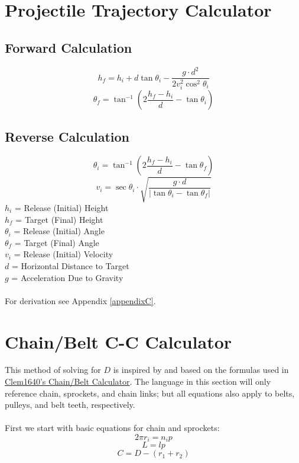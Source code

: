 \documentclass[11pt,a4paper,titlepage]{article}
\begin{document}
	\newpage
	\section{Projectile Trajectory Calculator}
	\subsection{Forward Calculation}
	\begin{equation} \label{proj_final_height}
		h_f = h_i + d \tan \theta_i - \frac{g \cdot d^2}{2 v_i^2 \cos^2 \theta_i}
	\end{equation}
	\begin{equation} \label{proj_final_angle}
		\theta_f = \tan^{-1} \left( 2 \frac{h_f - h_i}{d} - \tan \theta_i \right)
	\end{equation}
	
	\subsection{Reverse Calculation}
	\begin{equation} \label{proj_init_angle}
		\theta_i = \tan^{-1} \left( 2 \frac{h_f - h_i}{d} - \tan \theta_f \right)
	\end{equation}
	\begin{equation} \label{proj_init_vel}
		v_i = \sec \theta_i \cdot \sqrt{\frac{g \cdot d}{\left| \tan \theta_i - \tan \theta_f \right|}}
	\end{equation}
	$h_i$ = Release (Initial) Height \\
	$h_f$ = Target (Final) Height \\
	$\theta_i$ = Release (Initial) Angle \\
	$\theta_f$ = Target (Final) Angle \\
	$v_i$ = Release	(Initial) Velocity \\
	$d$ = Horizontal Distance to Target \\
	$g$ = Acceleration Due to Gravity\\ \\
	For derivation see Appendix \ref{appendixC}.
	
	\bigskip
	\section{Chain/Belt C-C Calculator}
	This method of solving for $D$ is inspired by and based on the formulas used in \href{https://www.chiefdelphi.com/t/paper-chain-belt-calculator/168971}{Clem1640's Chain/Belt Calculator}. The language in this section will only reference chain, sprockets, and chain links; but all equations also apply to belts, pulleys, and belt teeth, respectively. \\ \\		
	First we start with basic equations for chain and sprockets:
	\begin{equation}
		2 \pi r_i = n_i p
	\end{equation}
	\begin{equation}
		L = l p
	\end{equation}
	\begin{equation}
		C = D - (r_1 + r_2)
	\end{equation}
	
\end{document}
